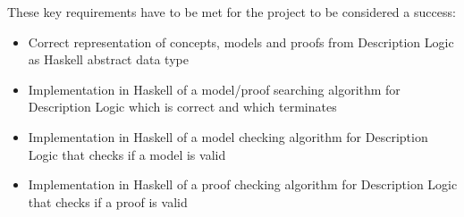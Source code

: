 These key requirements have to be met for the project to be considered a success:

\begin{itemize}
\item Correct representation of concepts, models and proofs from Description Logic as Haskell abstract data type
\item Implementation in Haskell of a model/proof searching algorithm for Description Logic which is correct and which terminates
\item Implementation in Haskell of a model checking algorithm for Description Logic that checks
if a model is valid
\item Implementation in Haskell of a proof checking algorithm for Description Logic that checks if a proof is valid
\end{itemize}

